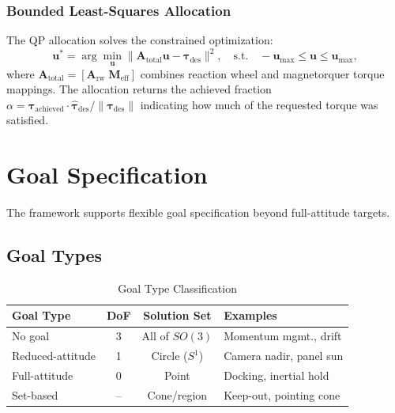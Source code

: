 \documentclass[conference]{IEEEtran}
\begin{document}
\subsubsection{Bounded Least-Squares Allocation}
The QP allocation solves the constrained optimization:
\begin{equation}
\mathbf{u}^* = \arg\min_{\mathbf{u}} \|\mathbf{A}_{\text{total}}\mathbf{u} - \boldsymbol{\tau}_{\text{des}}\|^2, \quad \text{s.t.} \quad -\mathbf{u}_{\max} \leq \mathbf{u} \leq \mathbf{u}_{\max},
\end{equation}
where $\mathbf{A}_{\text{total}} = [\mathbf{A}_{\text{rw}} \; \mathbf{M}_{\text{eff}}]$ combines reaction wheel and magnetorquer torque mappings. The allocation returns the achieved fraction $\alpha = \boldsymbol{\tau}_{\text{achieved}} \cdot \hat{\boldsymbol{\tau}}_{\text{des}} / \|\boldsymbol{\tau}_{\text{des}}\|$ indicating how much of the requested torque was satisfied.



\section{Goal Specification}\label{sec:goals}

The framework supports flexible goal specification beyond full-attitude targets.

\subsection{Goal Types}\label{subsec:goal_types}

\begin{table}[t]
    \centering
    \caption{Goal Type Classification}
    \label{tab:goal_types}
    \begin{tabular}{lccl}
        \toprule
        Goal Type & DoF & Solution Set & Examples \\
        \midrule
        No goal & 3 & All of $SO(3)$ & Momentum mgmt., drift \\
        Reduced-attitude & 1 & Circle ($S^1$) & Camera nadir, panel sun \\
        Full-attitude & 0 & Point & Docking, inertial hold \\
        Set-based & -- & Cone/region & Keep-out, pointing cone \\
        \bottomrule
    \end{tabular}
\end{table}
\end{document}
